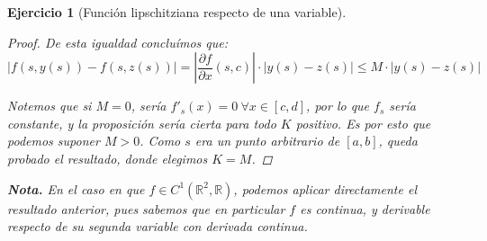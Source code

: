 \documentclass[11pt, a4paper, titlepage]{article}
\newcommand{\pder}[2][]{\frac{\partial#1}{\partial#2}}
\theoremstyle{exercise-style}
\newtheorem*{ejer}{Ejercicio}
\theoremstyle{theorem-style}
\begin{document}
\begin{ejer}[Función lipschitziana respecto de una variable]
\begin{proof}
De esta igualdad concluímos que: $$|f(s,y(s)) - f(s,z(s))| = \left|\pder[f]{x}(s,c)\right|\cdot|y(s)-z(s)| \le M\cdot|y(s)-z(s)|$$

Notemos que si $M=0$, sería $f'_s(x) = 0 \ \forall x \in [c,d]$, por lo que $f_s$ sería constante, y la proposición sería cierta para todo $K$ positivo. Es por esto que podemos suponer $M > 0$. Como $s$ era un punto arbitrario de $[a,b]$, queda probado el resultado, donde elegimos $K=M$.
\end{proof}

\textbf{Nota.} En el caso en que $f \in C^1(\mathbb{R}^2,\mathbb{R})$, podemos aplicar directamente el resultado anterior, pues sabemos que en particular $f$ es continua, y derivable respecto de su segunda variable con derivada continua.
	
\end{ejer}
\end{document}
